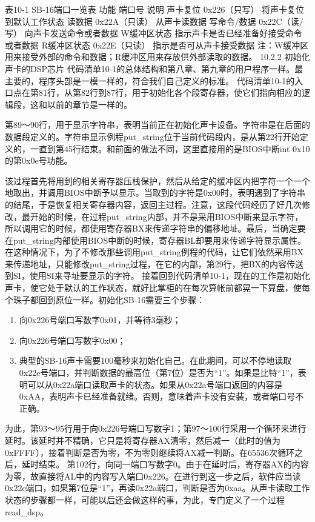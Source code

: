 \documentclass[12pt]{article}
\begin{document}
\begin{CJK}{UTF8}{gbsn}
表10-1 SB-16端口一览表
功能	端口号	说明
声卡复位	0x226（只写）	将声卡复位到默认工作状态
读数据	0x22A（只读）	从声卡读数据
写命令/数据	0x22C（读/写）	向声卡发送命令或者数据
W缓冲区状态		指示声卡是否已经准备好接受命令或者数据
R缓冲区状态	0x22E（只读）	指示是否可从声卡接受数据
注：W缓冲区用来接受外部的命令和数据；R缓冲区用来存放供外部读取的数据。
10.2.2  初始化声卡的DSP芯片
代码清单10-1的总体结构和第八章、第九章的用户程序一样。最主要的，程序头部是一模一样的，符合我们自己定义的标准。
代码清单10-1的入口点在第81行，从第82行到87行，用于初始化各个段寄存器，使它们指向相应的逻辑段，这和以前的章节是一样的。

第89～90行，用于显示字符串，表明当前正在初始化声卡设备。字符串是在后面的数据段定义的。字符串显示例程put\_{}string位于当前代码段内，是从第22行开始定义的，一直到第45行结束。和前面的做法不同，这里直接用的是BIOS中断int 0x10的第0x0e号功能。

该过程首先将用到的相关寄存器压栈保护，然后从给定的缓冲区内把字符一个一个地取出，并调用BIOS中断予以显示。当取到的字符是0x00时，表明遇到了字符串的结尾，于是恢复相关寄存器内容，返回主过程。注意，这段代码经历了好几次修改，最开始的时候，在过程put\_{}string内部，并不是采用BIOS中断来显示字符，所以调用它的时候，都使用寄存器BX来传递字符串的偏移地址。最后，当确定要在put\_{}string内部使用BIOS中断的时候，寄存器BL却要用来传递字符显示属性。在这种情况下，为了不修改那些调用put\_{}string例程的代码，让它们依然采用BX来传递地址，只能修改put\_{}string过程，在它的内部，第29行，把BX的内容传送到SI，使用SI来寻址要显示的字符。
接着回到代码清单10-1，现在的工作是初始化声卡，使它处于默认的工作状态，就好比掌柜的在每次算帐前都晃一下算盘，使每个珠子都回到原位一样。初始化SB-16需要三个步骤：
\begin{enumerate}
\item 向0x226号端口写数字0x01，并等待3毫秒；
\item 向0x226号端口写数字0x00；
\item 典型的SB-16声卡需要100毫秒来初始化自己。在此期间，可以不停地读取0x22e号端口，并判断数据的最高位（第7位）是否为“1”。如果是比特“1”，表明可以从0x22a端口读取声卡的状态。如果从0x22a号端口返回的内容是0xAA，表明声卡已经准备就绪。否则，意味着声卡没有安装，或者端口号不正确。
\end{enumerate}
为此，第93～95行用于向0x226号端口写数字1；第97～100行采用一个循环来进行延时。该延时并不精确，它只是将寄存器AX清零，然后减一（此时的值为0xFFFF），接着判断是否为零，不为零则继续将AX减一判断。在65536次循环之后，延时结束。
第102行，向同一端口写数字0。由于在延时后，寄存器AX的内容为零，故直接将AL中的内容写入端口0x226。在进行到这一步之后，软件应当读0x22e端口，如果第7位是“1”，再读0x22a端口，判断是否为0xaa。从声卡读取工作状态的步骤都一样，可能以后还会做这样的事，为此，专门定义了一个过程read\_{}dsp。


\end{CJK}
\end{document}
